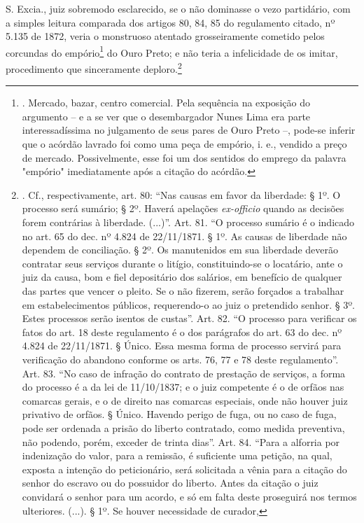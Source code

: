 S. Excia., juiz sobremodo esclarecido, se o não dominasse o vezo
partidário, com a simples leitura comparada dos artigos 80, 84, 85 do
regulamento citado, nº 5.135 de 1872, veria o monstruoso atentado
grosseiramente cometido pelos corcundas do empório\footnote{. Mercado,
  bazar, centro comercial. Pela sequência na exposição do argumento -- e
  a se ver que o desembargador Nunes Lima era parte interessadíssima no
  julgamento de seus pares de Ouro Preto --, pode-se inferir que o
  acórdão lavrado foi como uma peça de empório, i. e., vendido a preço
  de mercado. Possivelmente, esse foi um dos sentidos do emprego da
  palavra "empório" imediatamente após a citação do acórdão.} do Ouro
Preto; e não teria a infelicidade de os imitar, procedimento que
sinceramente deploro.\footnote{. Cf., respectivamente, art. 80: ``Nas
  causas em favor da liberdade: § 1º. O processo será sumário; § 2º.
  Haverá apelações \emph{ex-officio} quando as decisões forem contrárias
  à liberdade. (...)''. Art. 81. ``O processo sumário é o indicado no
  art. 65 do dec. nº 4.824 de 22/11/1871. § 1º. As causas de liberdade
  não dependem de conciliação. § 2º. Os manutenidos em sua liberdade
  deverão contratar seus serviços durante o litígio, constituindo-se o
  locatário, ante o juiz da causa, bom e fiel depositário dos salários,
  em benefício de qualquer das partes que vencer o pleito. Se o não
  fizerem, serão forçados a trabalhar em estabelecimentos públicos,
  requerendo-o ao juiz o pretendido senhor. § 3º. Estes processos serão
  isentos de custas''. Art. 82. ``O processo para verificar os fatos do
  art. 18 deste regulamento é o dos parágrafos do art. 63 do dec. nº
  4.824 de 22/11/1871. § Único. Essa mesma forma de processo servirá
  para verificação do abandono conforme os arts. 76, 77 e 78 deste
  regulamento''. Art. 83. ``No caso de infração do contrato de prestação
  de serviços, a forma do processo é a da lei de 11/10/1837; e o juiz
  competente é o de orfãos nas comarcas gerais, e o de direito nas
  comarcas especiais, onde não houver juiz privativo de orfãos. § Único.
  Havendo perigo de fuga, ou no caso de fuga, pode ser ordenada a prisão
  do liberto contratado, como medida preventiva, não podendo, porém,
  exceder de trinta dias''. Art. 84. ``Para a alforria por indenização
  do valor, para a remissão, é suficiente uma petição, na qual, exposta
  a intenção do peticionário, será solicitada a vênia para a citação do
  senhor do escravo ou do possuidor do liberto. Antes da citação o juiz
  convidará o senhor para um acordo, e só em falta deste proseguirá nos
  termos ulteriores. (...). § 1º. Se houver necessidade de curador,
}
